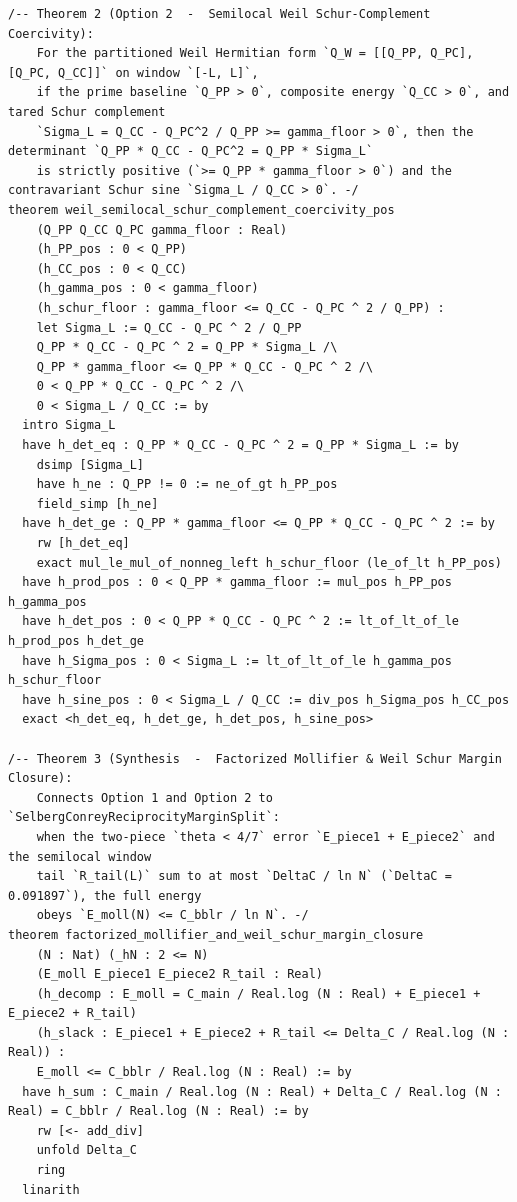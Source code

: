 \documentclass[11pt,a4paper]{article}
\begin{document}
\begin{lstlisting}[language=Lean4]
/-- Theorem 2 (Option 2  -  Semilocal Weil Schur-Complement Coercivity):
    For the partitioned Weil Hermitian form `Q_W = [[Q_PP, Q_PC], [Q_PC, Q_CC]]` on window `[-L, L]`,
    if the prime baseline `Q_PP > 0`, composite energy `Q_CC > 0`, and tared Schur complement
    `Sigma_L = Q_CC - Q_PC^2 / Q_PP >= gamma_floor > 0`, then the determinant `Q_PP * Q_CC - Q_PC^2 = Q_PP * Sigma_L`
    is strictly positive (`>= Q_PP * gamma_floor > 0`) and the contravariant Schur sine `Sigma_L / Q_CC > 0`. -/
theorem weil_semilocal_schur_complement_coercivity_pos
    (Q_PP Q_CC Q_PC gamma_floor : Real)
    (h_PP_pos : 0 < Q_PP)
    (h_CC_pos : 0 < Q_CC)
    (h_gamma_pos : 0 < gamma_floor)
    (h_schur_floor : gamma_floor <= Q_CC - Q_PC ^ 2 / Q_PP) :
    let Sigma_L := Q_CC - Q_PC ^ 2 / Q_PP
    Q_PP * Q_CC - Q_PC ^ 2 = Q_PP * Sigma_L /\
    Q_PP * gamma_floor <= Q_PP * Q_CC - Q_PC ^ 2 /\
    0 < Q_PP * Q_CC - Q_PC ^ 2 /\
    0 < Sigma_L / Q_CC := by
  intro Sigma_L
  have h_det_eq : Q_PP * Q_CC - Q_PC ^ 2 = Q_PP * Sigma_L := by
    dsimp [Sigma_L]
    have h_ne : Q_PP != 0 := ne_of_gt h_PP_pos
    field_simp [h_ne]
  have h_det_ge : Q_PP * gamma_floor <= Q_PP * Q_CC - Q_PC ^ 2 := by
    rw [h_det_eq]
    exact mul_le_mul_of_nonneg_left h_schur_floor (le_of_lt h_PP_pos)
  have h_prod_pos : 0 < Q_PP * gamma_floor := mul_pos h_PP_pos h_gamma_pos
  have h_det_pos : 0 < Q_PP * Q_CC - Q_PC ^ 2 := lt_of_lt_of_le h_prod_pos h_det_ge
  have h_Sigma_pos : 0 < Sigma_L := lt_of_lt_of_le h_gamma_pos h_schur_floor
  have h_sine_pos : 0 < Sigma_L / Q_CC := div_pos h_Sigma_pos h_CC_pos
  exact <h_det_eq, h_det_ge, h_det_pos, h_sine_pos>

/-- Theorem 3 (Synthesis  -  Factorized Mollifier & Weil Schur Margin Closure):
    Connects Option 1 and Option 2 to `SelbergConreyReciprocityMarginSplit`:
    when the two-piece `theta < 4/7` error `E_piece1 + E_piece2` and the semilocal window
    tail `R_tail(L)` sum to at most `DeltaC / ln N` (`DeltaC = 0.091897`), the full energy
    obeys `E_moll(N) <= C_bblr / ln N`. -/
theorem factorized_mollifier_and_weil_schur_margin_closure
    (N : Nat) (_hN : 2 <= N)
    (E_moll E_piece1 E_piece2 R_tail : Real)
    (h_decomp : E_moll = C_main / Real.log (N : Real) + E_piece1 + E_piece2 + R_tail)
    (h_slack : E_piece1 + E_piece2 + R_tail <= Delta_C / Real.log (N : Real)) :
    E_moll <= C_bblr / Real.log (N : Real) := by
  have h_sum : C_main / Real.log (N : Real) + Delta_C / Real.log (N : Real) = C_bblr / Real.log (N : Real) := by
    rw [<- add_div]
    unfold Delta_C
    ring
  linarith


\end{lstlisting}
\end{document}
